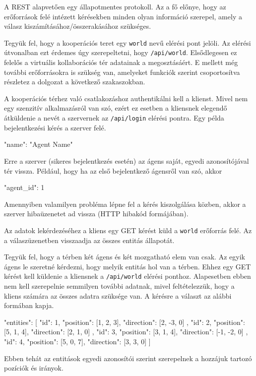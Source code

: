 


A REST alapvetően egy állapotmentes protokoll.
Az a fő előnye, hogy az erőforrások felé intézett kérésekben minden olyan információ szerepel, amely a válasz kiszámításához/összerakásához szükséges.

Tegyük fel, hogy a kooperációs teret egy \texttt{world} nevű elérési pont jelöli.
Az elérési útvonalban ezt érdemes úgy szerepeltetni, hogy \texttt{/api/world}.
Elsődlegesen ez felelős a virtuális kollaborációs tér adatainak a megosztásáért.
E mellett még további erőforrásokra is szükség van, amelyeket funkciók szerint csoportosítva részletez a dolgozat a következő szakaszokban.


A kooperációs térhez való csatlakozáshoz authentikálni kell a klienst.
Mivel nem egy szenzitív alkalmazásról van szó, ezért ez esetben a kliensnek elegendő átküldenie a nevét a szervernek az \texttt{/api/login} elérési pontra.
Egy példa bejelentkezési kérés a szerver felé.
\begin{python}
{ "name": "Agent Name" }
\end{python}
Erre a szerver (sikeres bejelentkezés esetén) az ágens saját, egyedi azonosítójával tér vissza.
Például, hogy ha az első bejelentkező ágensről van szó, akkor
\begin{python}
{ "agent_id": 1 }
\end{python}
Amennyiben valamilyen probléma lépne fel a kérés kiszolgálása közben, akkor a szerver hibaüzenetet ad vissza (HTTP hibakód formájában).


Az adatok lekérdezéséhez a kliens egy GET kérést küld a \texttt{world} erőforrás felé.
Az a válaszüzenetben visszaadja az összes entitás állapotát.

Tegyük fel, hogy a térben két ágens és két mozgatható elem van csak.
Az egyik ágens le szeretné kérdezni, hogy melyik entitás hol van a térben.
Ehhez egy GET kérést kell küldenie a kliensnek a \texttt{/api/world} elérési ponthoz.
Alapesetben ebben nem kell szerepelnie semmilyen további adatnak, mivel feltételezzük, hogy a kliens számára az összes adatra szüksége van.
A kérésre a választ az alábbi formában kapja.
\begin{python}
{
  "entities": [
    {
      "id": 1,
      "position": [1, 2, 3],
      "direction": [2, -3, 0]
    },
    {
      "id": 2,
      "position": [5, 1, 4],
      "direction": [2, 1, 0]
    },
    {
      "id": 3,
      "position": [3, 1, 4],
      "direction": [-1, -2, 0]
    },
    {
      "id": 4,
      "position": [5, 0, 7],
      "direction": [3, 3, 0]
    }
  ]
}
\end{python}
Ebben tehát az entitások egyedi azonosítói szerint szerepelnek a hozzájuk tartozó pozíciók és irányok.

